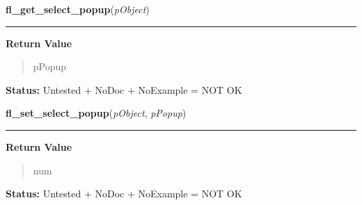 \hspace{.8\funcindent}\begin{boxedminipage}{\funcwidth}

    \raggedright \textbf{fl\_get\_select\_popup}(\textit{pObject})

    \vspace{-1.5ex}

    \rule{\textwidth}{0.5\fboxrule}
\setlength{\parskip}{2ex}
\setlength{\parskip}{1ex}
      \textbf{Return Value}
    \vspace{-1ex}

      \begin{quote}
      pPopup

      \end{quote}

\textbf{Status:} Untested + NoDoc + NoExample = NOT OK



    \end{boxedminipage}

    \label{xformslib:library:fl_set_select_popup}

    \vspace{0.5ex}

\hspace{.8\funcindent}\begin{boxedminipage}{\funcwidth}

    \raggedright \textbf{fl\_set\_select\_popup}(\textit{pObject}, \textit{pPopup})

    \vspace{-1.5ex}

    \rule{\textwidth}{0.5\fboxrule}
\setlength{\parskip}{2ex}
\setlength{\parskip}{1ex}
      \textbf{Return Value}
    \vspace{-1ex}

      \begin{quote}
      num

      \end{quote}

\textbf{Status:} Untested + NoDoc + NoExample = NOT OK



    \end{boxedminipage}

    \label{xformslib:library:fl_get_select_item}

